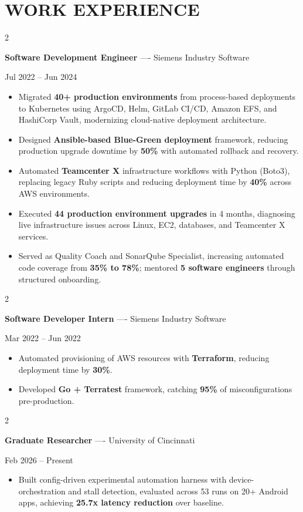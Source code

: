 \documentclass[10pt, letterpaper]{article}
\newenvironment{highlights}{
    \begin{itemize}[
        topsep=0.10 cm,
        parsep=0.06 cm,
        partopsep=0pt,
        itemsep=0.06 cm,
        leftmargin=12pt
    ]
}{
    \end{itemize}
}
\newenvironment{twocolentry}[2][]{
    \onecolentry
    \def\secondColumn{#2}
    \setcolumnwidth{\fill, 4.5 cm}
    \begin{paracol}{2}
}{
    \switchcolumn \raggedleft \secondColumn
    \end{paracol}
    \endonecolentry
}
\begin{document}
\section{WORK EXPERIENCE}
\begin{twocolentry}{Jul 2022 -- Jun 2024}
\textbf{Software Development Engineer} ---- Siemens Industry Software
\end{twocolentry}
\begin{highlights}
  \item Migrated \textbf{40+ production environments} from process-based deployments to Kubernetes using ArgoCD, Helm, GitLab CI/CD, Amazon EFS, and HashiCorp Vault, modernizing cloud-native deployment architecture.
  \item Designed \textbf{Ansible-based Blue-Green deployment} framework, reducing production upgrade downtime by \textbf{50\%} with automated rollback and recovery.
  \item Automated \textbf{Teamcenter X} infrastructure workflows with Python (Boto3), replacing legacy Ruby scripts and reducing deployment time by \textbf{40\%} across AWS environments.
  \item Executed \textbf{44 production environment upgrades} in 4 months, diagnosing live infrastructure issues across Linux, EC2, databases, and Teamcenter X services.
  \item Served as Quality Coach and SonarQube Specialist, increasing automated code coverage from \textbf{35\% to 78\%}; mentored \textbf{5 software engineers} through structured onboarding.
\end{highlights}

\vspace{0.15 cm}

\begin{twocolentry}{Mar 2022 -- Jun 2022}
\textbf{Software Developer Intern} ---- Siemens Industry Software
\end{twocolentry}
\begin{highlights}
  \item Automated provisioning of AWS resources with \textbf{Terraform}, reducing deployment time by \textbf{30\%}.
  \item Developed \textbf{Go + Terratest} framework, catching \textbf{95\%} of misconfigurations pre-production.
\end{highlights}

\vspace{0.15 cm}

\begin{twocolentry}{Feb 2026 -- Present}
\textbf{Graduate Researcher} ---- University of Cincinnati
\end{twocolentry}
\begin{highlights}
  \item Built config-driven experimental automation harness with device-orchestration and stall detection, evaluated across 53 runs on 20+ Android apps, achieving \textbf{25.7x latency reduction} over baseline.
\end{highlights}
\end{document}
